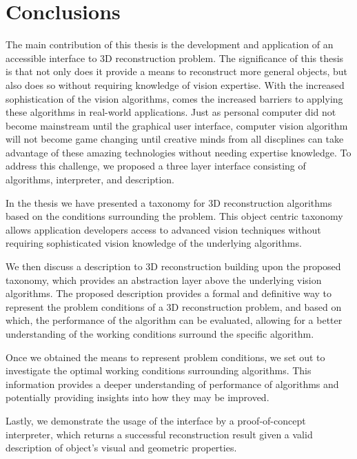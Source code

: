 
\chapter{Conclusions}
\label{ch:conclusion}
The main contribution of this thesis is the development and application of an accessible interface to 3D reconstruction problem. The significance of this thesis is that not only does it provide a means to reconstruct more general objects, but also does so without requiring knowledge of vision expertise. With the increased sophistication of the vision algorithms, comes the increased barriers to applying these algorithms in real-world applications. Just as personal computer did not become mainstream until the graphical user interface, computer vision algorithm will not become game changing until creative minds from all discplines can take advantage of these amazing technologies without needing expertise knowledge. To address this challenge, we proposed a three layer interface consisting of algorithms, interpreter, and description.

In the thesis we have presented a taxonomy for 3D reconstruction algorithms based on the conditions surrounding the problem. This object centric taxonomy allows application developers access to advanced vision techniques without requiring sophisticated vision knowledge of the underlying algorithms.

We then discuss a description to 3D reconstruction building upon the proposed taxonomy, which provides an abstraction layer above the underlying vision algorithms. The proposed description provides a formal and definitive way to represent the problem conditions of a 3D reconstruction problem, and based on which, the performance of the algorithm can be evaluated, allowing for a better understanding of the working conditions surround the specific algorithm. 

Once we obtained the means to represent problem conditions, we set out to investigate the optimal working conditions surrounding algorithms. This information provides a deeper understanding of performance of algorithms and potentially providing insights into how they may be improved. 

Lastly, we demonstrate the usage of the interface by a proof-of-concept interpreter, which returns a successful reconstruction result given a valid description of object's visual and geometric properties.

